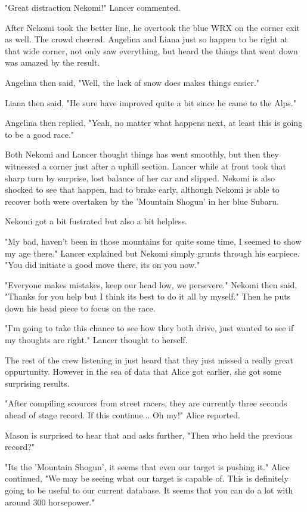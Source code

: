"Great distraction Nekomi!" Lancer commented.

After Nekomi took the better line, he overtook the blue WRX on the corner exit as well. The crowd cheered. Angelina and Liana just so happen to be right at that wide corner, not only saw everything, but heard the things that went down was amazed by the result.

Angelina then said, "Well, the lack of snow does makes things easier."

Liana then said, "He sure have improved quite a bit since he came to the Alps."

Angelina then replied, "Yeah, no matter what happens next, at least this is going to be a good race."

Both Nekomi and Lancer thought things has went smoothly, but then they witnessed a corner just after a uphill section. Lancer while at front took that sharp turn by surprise, lost balance of her car and slipped. Nekomi is also shocked to see that happen, had to brake early, although Nekomi is able to recover both were overtaken by the 'Mountain Shogun' in her blue Subaru.

Nekomi got a bit fustrated but also a bit helpless.

"My bad, haven't been in those mountains for quite some time, I seemed to show my age there." Lancer explained but Nekomi simply grunts through his earpiece. "You did initiate a good move there, its on you now."

"Everyone makes mistakes, keep our head low, we persevere." Nekomi then said, "Thanks for you help but I think its best to do it all by myself." Then he puts down his head piece to focus on the race.

"I'm going to take this chance to see how they both drive, just wanted to see if my thoughts are right." Lancer thought to herself.

The rest of the crew listening in just heard that they just missed a really great oppurtunity. However in the sea of data that Alice got earlier, she got some surprising results.

"After compiling scources from street racers, they are currently three seconds ahead of stage record. If this continue... Oh my!" Alice reported.

Mason is surprised to hear that and asks further, "Then who held the previous record?"

"Its the 'Mountain Shogun', it seems that even our target is pushing it." Alice continued, "We may be seeing what our target is capable of. This is definitely going to be useful to our current database. It seems that you can do a lot with around 300 horsepower."

